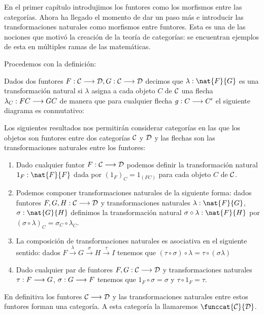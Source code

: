 En el primer capítulo introdujimos los funtores como los morfismos
entre las categorías. Ahora ha llegado el momento de dar un paso más
e introducir las transformaciones naturales como morfismos entre
funtores. Esta es una de las nociones que motivó la creación de la
teoría de categorías: se encuentran ejemplos de esta en múltiples
ramas de las matemáticas.

Procedemos con la definición:

\begin{definition}
  Dados dos funtores $F: \mathcal{C}\longrightarrow \mathcal{D}, G : \mathcal{C}\longrightarrow \mathcal{D}$ decimos
  que $\lambda : \nat{F}{G}$ es una transformación natural si $\lambda$
  asigna a cada objeto $C$ de $\mathcal{C}$ una flecha
  $\lambda_C : FC\longrightarrow GC$ de manera que para
  cualquier flecha $g : C\longrightarrow C'$ el siguiente diagrama
  es conmutativo:
\begin{center}
  \end{center}
\end{definition}

Los siguientes resultados nos permitirán considerar categorías en las
que los objetos son funtores entre dos categorías $\mathcal{C}$ y $\mathcal{D}$ y las
flechas son las transformaciones naturales entre los funtores:

\begin{proposition}
  \begin{enumerate}
  \item Dado cualquier funtor $F : \mathcal{C}\longrightarrow \mathcal{D}$ podemos definir
    la transformación natural $1_F : \nat{F}{F}$ dada por
    ${(1_F)}_C = 1_{(FC)}$
    para cada objeto $C$ de $\mathcal{C}$.
  \item Podemos componer transformaciones naturales de la siguiente
    forma: dados funtores $F, G, H : \mathcal{C}\longrightarrow \mathcal{D}$ y transformaciones
    naturales $\lambda : \nat{F}{G}$, $\sigma : \nat{G}{H}$
    definimos la transformación natural
    $\sigma \circ \lambda : \nat{F}{H}$ por
    $(\sigma\circ\lambda)_C = \sigma_C \circ \lambda_C$.
  \item La composición de transformaciones naturales
    es asociativa en el siguiente sentido: dados
    $F \xrightarrow{\lambda} G \xrightarrow{\sigma} H \xrightarrow{\tau}I$
    tenemos que $(\tau \circ \sigma) \circ \lambda = \tau \circ (\sigma \lambda)$
  \item Dado cualquier par de funtores $F,G : \mathcal{C}\longrightarrow \mathcal{D}$ y
    transformaciones naturales $\tau : F\longrightarrow G$,
    $\sigma : G\longrightarrow F$ tenemos que $1_F \circ \sigma = \sigma$
    y $\tau \circ 1_F = \tau$.
  \end{enumerate}

  En definitiva los funtores $\mathcal{C}\longrightarrow \mathcal{D}$ y las transformaciones
  naturales entre estos funtores forman una categoría. A esta categoría
  la llamaremos $\funccat{\C}{\D}$.
\end{proposition}

